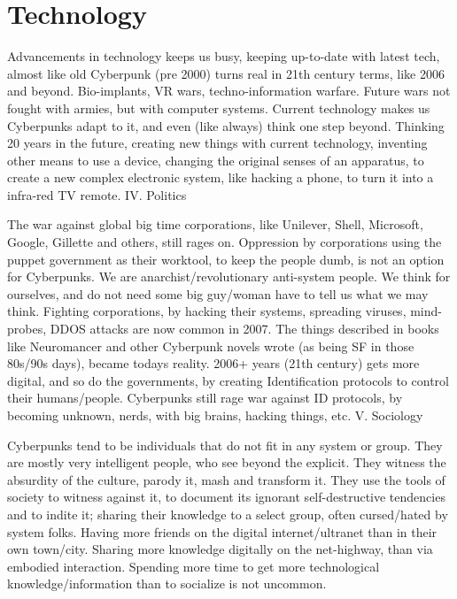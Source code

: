 \documentclass[letterpaper,12pt,english]{sphinxmanual}
\begin{document}
\section{Technology}
\label{2007:technology}
Advancements in technology keeps us busy, keeping up-to-date with latest tech, almost like old Cyberpunk (pre 2000) turns real in 21th century terms, like 2006 and beyond. Bio-implants, VR wars, techno-information warfare. Future wars not fought with armies, but with computer systems. Current technology makes us Cyberpunks adapt to it, and even (like always) think one step beyond. Thinking 20 years in the future, creating new things with current technology, inventing other means to use a device, changing the original senses of an apparatus, to create a new complex electronic system, like hacking a phone, to turn it into a infra-red TV remote.
IV. Politics

The war against global big time corporations, like Unilever, Shell, Microsoft, Google, Gillette and others, still rages on. Oppression by corporations using the puppet government as their worktool, to keep the people dumb, is not an option for Cyberpunks. We are anarchist/revolutionary anti-system people. We think for ourselves, and do not need some big guy/woman have to tell us what we may think. Fighting corporations, by hacking their systems, spreading viruses, mind-probes, DDOS attacks are now common in 2007. The things described in books like Neuromancer and other Cyberpunk novels wrote (as being SF in those 80s/90s days), became todays reality. 2006+ years (21th century) gets more digital, and so do the governments, by creating Identification protocols to control their humans/people. Cyberpunks still rage war against ID protocols, by becoming unknown, nerds, with big brains, hacking things, etc.
V. Sociology

Cyberpunks tend to be individuals that do not fit in any system or group. They are mostly very intelligent people, who see beyond the explicit. They witness the absurdity of the culture, parody it, mash and transform it. They use the tools of society to witness against it, to document its ignorant self-destructive tendencies and to indite it; sharing their knowledge to a select group, often cursed/hated by system folks. Having more friends on the digital internet/ultranet than in their own town/city. Sharing more knowledge digitally on the net-highway, than via embodied interaction. Spending more time to get more technological knowledge/information than to socialize is not uncommon.
\end{document}
